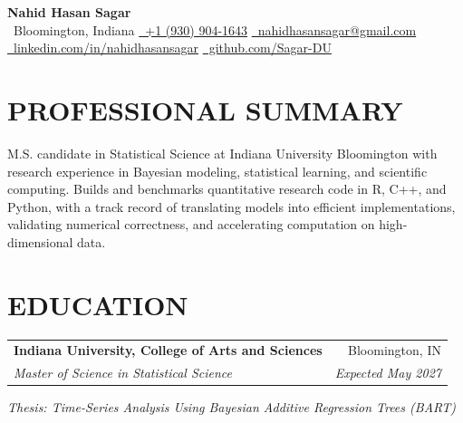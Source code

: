 \documentclass[10pt,letterpaper]{article}
\makeatletter
\newcommand{\resumeEntry}[4]{%
	\begin{tabularx}{\textwidth}{@{}Xr@{}}
		\textbf{#1} & #2 \\
		\textit{#3} & \textit{#4}
	\end{tabularx}%
}
\newcommand{\contactsep}{\qquad}
\makeatother
\begin{document}
\normalsize

\begin{center}
	{\LARGE
	 \textbf{Nahid Hasan Sagar}}\\[2.2pt]

	{\footnotesize
		\faMapMarker*\, Bloomington, Indiana
		\contactsep
		\href{tel:+19309041643}{\faPhone*\, +1 (930) 904-1643}
		\contactsep
		\href{mailto:nahidhasansagar@gmail.com}{\faEnvelope\, nahidhasansagar@gmail.com}
	}\\[-0.2pt]

	{\footnotesize
		\href{https://www.linkedin.com/in/nahidhasansagar/}{\faLinkedinIn\, linkedin.com/in/nahidhasansagar}
		\contactsep
		\href{https://github.com/Sagar-DU}{\faGithub\, github.com/Sagar-DU}
	}
\end{center}

\vspace{-5pt}

\section*{PROFESSIONAL SUMMARY}

M.S. candidate in Statistical Science at Indiana University Bloomington with research experience in Bayesian modeling, statistical learning, and scientific computing. Builds and benchmarks quantitative research code in R, C++, and Python, with a track record of translating models into efficient implementations, validating numerical correctness, and accelerating computation on high-dimensional data.

\section*{EDUCATION}

\resumeEntry
	{Indiana University, College of Arts and Sciences}
	{Bloomington, IN}
	{Master of Science in Statistical Science}
	{Expected May 2027}

\vspace{0.4pt}

\textit{Thesis: Time-Series Analysis Using Bayesian Additive Regression Trees (BART)}
\end{document}
